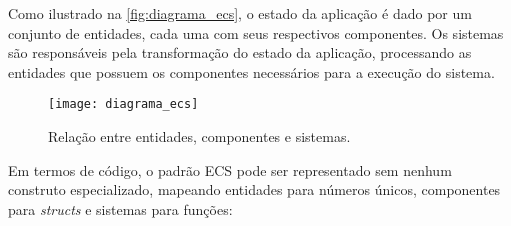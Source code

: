 Como ilustrado na \autoref{fig:diagrama_ecs}, o estado da aplicação é dado por um conjunto de entidades, cada uma com seus respectivos componentes. Os sistemas são responsáveis pela transformação do estado da aplicação, processando as entidades que possuem os componentes necessários para a execução do sistema.

\begin{figure}[H]
	\centering
	\texttt{[image: diagrama\_ecs]}
	\caption{Relação entre entidades, componentes e sistemas.}
	\label{fig:diagrama_ecs}
\end{figure}

Em termos de código, o padrão ECS pode ser representado sem nenhum construto especializado, mapeando entidades para números únicos, componentes para \textit{structs} e sistemas para funções:







